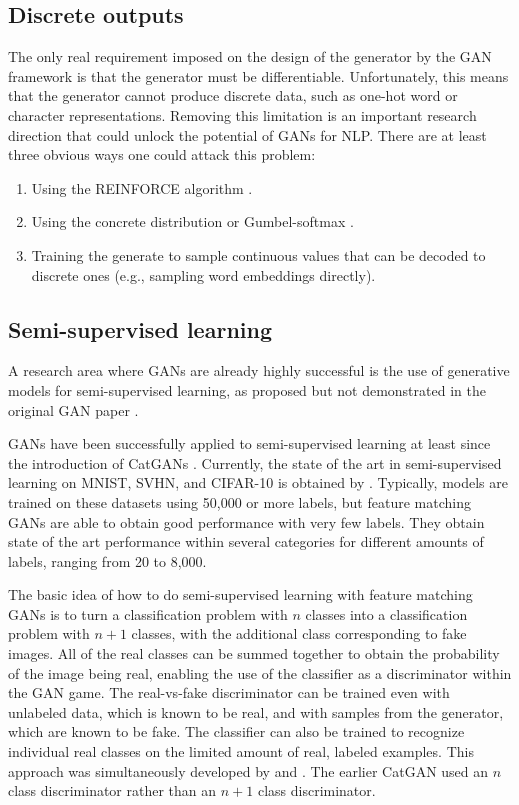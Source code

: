 \subsection{Discrete outputs}

The only real requirement imposed on the design of the generator by the GAN framework
is that the generator must be differentiable.
Unfortunately, this means that the generator cannot produce discrete data, such
as one-hot word or character representations.
Removing this limitation is an important research direction that could unlock the
potential of GANs for NLP.
There are at least three obvious ways one could attack this problem:
\begin{enumerate}
  \item Using the REINFORCE algorithm \citep{Williams-1992}.
  \item Using the concrete distribution \citep{maddison2016concrete} or Gumbel-softmax \citep{jang2016categorical}.
  \item Training the generate to sample continuous values that can be decoded to discrete ones (e.g., sampling
    word embeddings directly).
\end{enumerate}

\subsection{Semi-supervised learning}
\label{sec:ssl}

A research area where GANs are already highly successful is the use of generative
models for semi-supervised learning, as proposed but not demonstrated in the original
GAN paper \citep{Goodfellow-et-al-NIPS2014-small}.

GANs have been successfully applied to semi-supervised learning at least since the introduction
of CatGANs \citep{springenberg2015unsupervised}.
Currently, the state of the art in semi-supervised learning on MNIST, SVHN, and CIFAR-10
is obtained by  \citep{salimans2016improved}.
Typically, models are trained on these datasets using 50,000 or more labels,
but feature matching GANs are able to obtain good performance
with very few labels.
They obtain state of the art performance within several categories for different
amounts of labels, ranging from 20 to 8,000.

The basic idea of how to do semi-supervised learning with feature matching GANs
is to turn a classification problem with $n$ classes into a classification problem
with $n+1$ classes, with the additional class corresponding to fake images.
All of the real classes can be summed together to obtain the probability of the
image being real, enabling the use of the classifier as a discriminator within
 the GAN game.
 The real-vs-fake discriminator can be trained even with unlabeled data, which
 is known to be real, and with samples from the generator, which are known to
 be fake.
 The classifier can also be trained to recognize individual real classes on the limited
 amount of real, labeled examples.
 This approach was simultaneously developed by \citet{salimans2016improved}
 and \citet{odena2016semi}. The earlier CatGAN used an $n$ class discriminator
 rather than an $n+1$ class discriminator.

